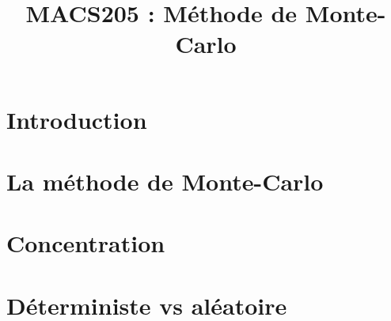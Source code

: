 \documentclass[a4paper,9pt]{article}
\title{\vspace{-1.2cm} \textbf{MACS205 : Méthode de Monte-Carlo}}
\begin{document}
\maketitle

\vspace{-1.5cm}


\section{Introduction}
	

\section{La méthode de Monte-Carlo}
	

\section{Concentration}
	

\section{Déterministe vs aléatoire}
	
\end{document}
